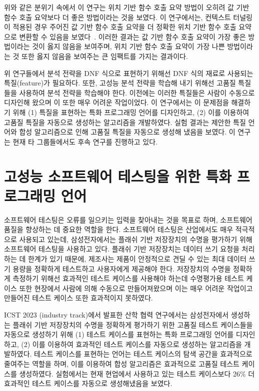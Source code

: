 \documentclass[11pt]{article}
\newcommand{\myparagraph}[1]{\medskip{\it \textbf{#1.}}}
\begin{document}
\begin{spacing}{1.145}
위와 같은 분위기 속에서 이 연구는 위치 기반 함수 호출 요약 방법이 오히려 값 기반 함수 호출 요약보다 더 좋은 방법이라는 것을 보였다.
%
이 연구에서는, 컨텍스트 터널링이 적용된 경우 주어진 값 기반 함수 호출 요약을 더 정확한 위치 기반 함수 호출 요약으로 변환할 수 있음을 보였다~\cite{JeOh22}.
%
이러한 결과는 값 기반 함수 호출 요약이 가장 좋은 방법이라는 것이 옳지 않음을 보여주며, 위치 기반 함수 호출 요약이 가장 나쁜 방법이라는 것 또한 옳지 않음을 보여주는 큰 임팩트를 가지는 결과이다.




\myparagraph{특질 자동 생성을 위한 특질 언어 및 합성 알고리즘~\cite{Jeon20}}
%
위 연구들에서 분석 전략을 DNF 식으로 표현하기 위해선 DNF 식의 재료로 사용되는 특질(feature)가 필요하다.
%
또한, 고성능 분석 전략을 학습해 내기 위해선 고품질 특질들을 사용하여 분석 전략을 학습해야 한다.
%
이전에는 이러한 특질들은 사람이 수동으로 디자인해 왔으며 이 또한 매우 어려운 작업이었다.
%
이 연구에서는 이 문제점을 해결하기 위해 (1) 특질을 표현하는 특화 프로그래밍 언어를 디자인하고, (2) 이를 이용하여 고품질 특질을 자동으로 생성하는 알고리즘을 개발하였다.
%
실험 결과는 제안한 특질 언어와 합성 알고리즘으로 인해 고품질 특질을 자동으로 생성해 냈음을 보였다.
%
이 연구는 현재 타 그룹들에서도 후속 연구를 진행하고 있다.



\section{고성능 소프트웨어 테스팅을 위한 특화 프로그래밍 언어}
\hspace{\parindent}
소프트웨어 테스팅은 오류를 일으키는 입력을 찾아내는 것을 목표로 하며, 소프트웨어 품질을 향상하는 데 중요한 역할을 한다.
%
소프트웨어 테스팅은 산업에서도 매우 적극적으로 사용되고 있는데, 삼성전자에서는 플래쉬 기반 저장장치의 수명을 평가하기 위해 소프트웨어 테스팅을 사용하고 있다.
%
플래쉬 기반 저장장치는 데이터 쓰기 요청을 처리하는 데 한계가 있기 때문에, 제조사는 제품이 안정적으로 견딜 수 있는 최대 데이터 쓰기 용량을 정확하게 테스트하고 사용자에게 제공해야 한다.
%
저장장치의 수명을 정확하게 측정하기 위해선 효과적인 테스트 케이스를 사용해야 하는데 수명평가용 테스트 케이스 또한 현장에서 사람에 의해 수동으로 만들어져왔으며 이는 매우 어려운 작업이고 만들어진 테스트 케이스 또한 효과적이지 못하였다.


ICST 2023 (industry track)에서 발표한 산학 협력 연구에서는 삼성전자에서 생성하는 플래쉬 기반 저장장치의 수명을 정확하게 평가하기 위한 고품질 테스트 케이스들을 자동으로 생성하기 위해 (1) 테스트 케이스를 표현하는 특화 프로그래밍 언어를 디자인하고, (2) 이를 이용하여 효과적인 테스트 케이스를 자동으로 생성하는 알고리즘을 개발하였다.
%
테스트 케이스를 표현하는 언어는 테스트 케이스의 탐색 공간을 효과적으로 줄여주는 역할을 하며, 이를 이용하여 합성 알고리즘은 효과적으로 고품질 테스트 케이스를 생성하였다.
%
실험에서는 현재 현업에서 사용하고 있는 테스트 케이스보다 26\% 더 효과적인 테스트 케이스를 자동으로 생성해냈음을 보였다.
%






\end{spacing}
\end{document}
